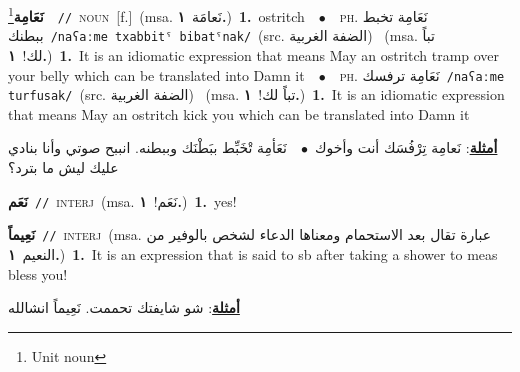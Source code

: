 \documentclass[10pt,a4paper,twoside]{article} %
\begin{document}
\begin{multicols}{2}
{\setlength\topsep{0pt}\textbf{\foreignlanguage{arabic}{نَعَامِة}}\footnote{Unit noun}\ \ {\color{gray}\texttt{//}\color{black}}\ \textsc{noun}\ [f.]\ \color{gray}(msa. \foreignlanguage{arabic}{نَعامَة}~\foreignlanguage{arabic}{\textbf{١.}})\color{black}\ \textbf{1.}~ostritch\ \ $\bullet$\ \ \textsc{ph.} \color{gray} \foreignlanguage{arabic}{نَعَامِة تخبط ببطنك}\color{black}\ {\color{gray}\texttt{/{\sffamily naʕaːme txabbitˤ bibatˤnak}/}\color{black}}\ \color{gray}(src. \foreignlanguage{arabic}{الضفة الغربية})\color{black}\ \color{gray} (msa. \foreignlanguage{arabic}{تباً لك!}~\foreignlanguage{arabic}{\textbf{١.}})\color{black}\ \textbf{1.}~It is an idiomatic expression that means May an ostritch tramp over your belly  which can be translated into Damn it\ \ $\bullet$\ \ \textsc{ph.} \color{gray} \foreignlanguage{arabic}{نَعَامِة ترفسك}\color{black}\ {\color{gray}\texttt{/{\sffamily naʕaːme turfusak}/}\color{black}}\ \color{gray}(src. \foreignlanguage{arabic}{الضفة الغربية})\color{black}\ \color{gray} (msa. \foreignlanguage{arabic}{تباً لك!}~\foreignlanguage{arabic}{\textbf{١.}})\color{black}\ \textbf{1.}~It is an idiomatic expression that means May an ostritch kick you  which can be translated into Damn it\  \begin{flushright}\color{gray}\foreignlanguage{arabic}{\textbf{\underline{\foreignlanguage{arabic}{أمثلة}}}: نَعامِة تِرْفُسَك أنت وأخوك\ $\bullet$\ \  نَعَأمِة تْخَبِّط ببَطْنَك وببطنه. انببح صوتي وأنا بنادي عليك ليش ما بترد؟}\end{flushright}\color{black}} \vspace{2mm}

{\setlength\topsep{0pt}\textbf{\foreignlanguage{arabic}{نَعَم}}\ {\color{gray}\texttt{//}\color{black}}\ \textsc{interj}\ \color{gray}(msa. \foreignlanguage{arabic}{نَعَم!}~\foreignlanguage{arabic}{\textbf{١.}})\color{black}\ \textbf{1.}~yes!\ } \vspace{2mm}

{\setlength\topsep{0pt}\textbf{\foreignlanguage{arabic}{نَعِيماً}}\ {\color{gray}\texttt{//}\color{black}}\ \textsc{interj}\ \color{gray}(msa. \foreignlanguage{arabic}{عبارة تقال بعد الاستحمام ومعناها الدعاء لشخص بالوفير من النعيم}~\foreignlanguage{arabic}{\textbf{١.}})\color{black}\ \textbf{1.}~It is an expression that is said to sb after taking a shower to meas bless you!\  \begin{flushright}\color{gray}\foreignlanguage{arabic}{\textbf{\underline{\foreignlanguage{arabic}{أمثلة}}}: شو شايفتك تحممت. نَعِيماً انشالله}\end{flushright}\color{black}} \vspace{2mm}


\end{multicols}
\end{document}
